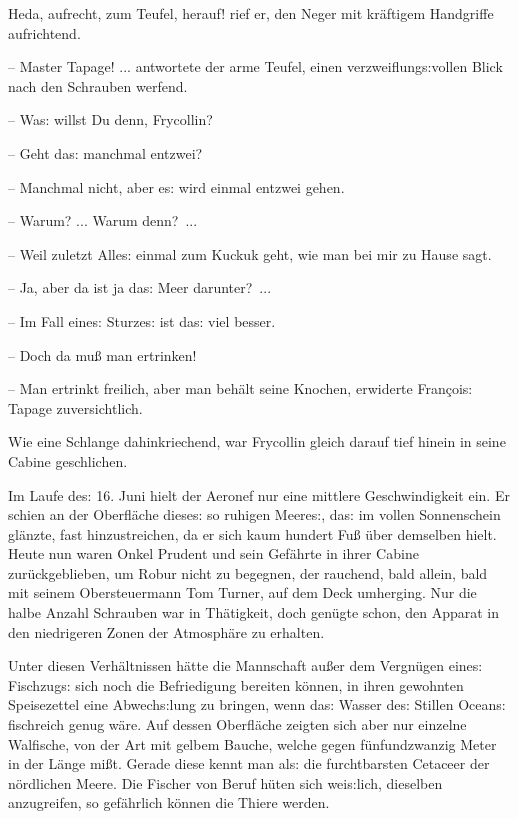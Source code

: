 \documentclass[oneside,12pt]{book}
\newcommand{\s}{s:}
\begin{document}
{\glqq}Heda, aufrecht, zum Teufel, herauf! rief er, den Neger mit
kr\"aftigem Handgriffe aufrichtend.

-- Master Tapage! ... antwortete der arme Teufel, einen
verzweiflung{\s}vollen Blick nach den Schrauben werfend.

-- Wa{\s} willst Du denn, Frycollin?

-- Geht da{\s} manchmal ent\/zwei?

-- Manchmal nicht, aber e{\s} wird einmal ent\/zwei gehen.

-- Warum? ... Warum denn?~...

-- Weil zuletzt Alle{\s} einmal zum Kuckuk geht, wie man bei mir zu
Hause sagt.

-- Ja, aber da ist ja da{\s} Meer darunter?~...

-- Im Fall eine{\s} Sturze{\s} ist da{\s} viel besser.

-- Doch da mu{\ss} man ertrinken!

-- Man ertrinkt freilich, aber man beh\"alt seine Knochen{\grqq},
erwiderte Fran\c{c}oi{\s} Tapage zuversichtlich.

Wie eine Schlange dahinkriechend, war Frycollin gleich darauf tief
hinein in seine Cabine geschlichen.

Im Laufe de{\s} 16. Juni hielt der Aeronef nur eine mittlere
Geschwindigkeit ein. Er schien an der Oberfl\"ache diese{\s} so
ruhigen Meere{\s}, da{\s} im vollen Sonnenschein gl\"anzte, fast
hinzustreichen, da er sich kaum hundert Fu{\ss} \"uber demselben
hielt. Heute nun waren Onkel Prudent und sein Gef\"ahrte in ihrer
Cabine zur\"uckgeblieben, um Robur nicht zu begegnen, der rauchend,
bald allein, bald mit seinem Obersteuermann Tom Turner, auf dem Deck
umherging. Nur die halbe Anzahl Schrauben war in Th\"atigkeit, doch
gen\"ugte schon, den Apparat in den niedrigeren Zonen der
Atmosph\"are zu erhalten.

Unter diesen Verh\"altnissen h\"atte die Mannschaft au{\ss}er dem
Vergn\"ugen eine{\s} Fischzug{\s} sich noch die Befriedigung bereiten
k\"onnen, in ihren gewohnten Speisezettel eine Abwech{\s}lung zu
bringen, wenn da{\s} Wasser de{\s} Stillen Ocean{\s} fischreich genug
w\"are. Auf dessen Oberfl\"ache zeigten sich aber nur einzelne
Walfische, von der Art mit gelbem Bauche, welche gegen
f\"unfundzwanzig Meter in der L\"ange mi{\ss}t. Gerade diese kennt
man al{\s} die furchtbarsten Cetaceer der n\"ordlichen Meere. Die
Fischer von Beruf h\"uten sich wei{\s}lich, dieselben anzugreifen, so
gef\"ahrlich k\"onnen die Thiere werden.
\end{document}
